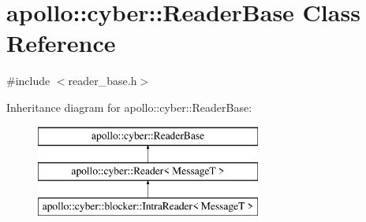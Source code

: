 \hypertarget{classapollo_1_1cyber_1_1ReaderBase}{\section{apollo\-:\-:cyber\-:\-:Reader\-Base Class Reference}
\label{classapollo_1_1cyber_1_1ReaderBase}
}


{\ttfamily \#include $<$reader\-\_\-base.\-h$>$}

Inheritance diagram for apollo\-:\-:cyber\-:\-:Reader\-Base\-:\begin{figure}[H]
\begin{center}
\leavevmode
\includegraphics[height=3.000000cm]{classapollo_1_1cyber_1_1ReaderBase}
\end{center}
\end{figure}
